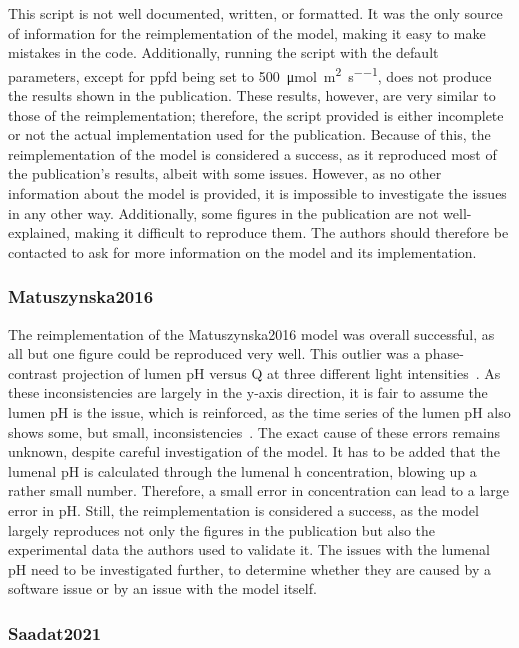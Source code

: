 This script is not well documented, written, or formatted. It was the only source of information for the reimplementation of the model, making it easy to make mistakes in the code. Additionally, running the script with the default parameters, except for \gls{ppfd} being set to \qty{500}{\micro\mol\per\meter\squared\per\second}, does not produce the results shown in the publication. These results, however, are very similar to those of the reimplementation; therefore, the script provided is either incomplete or not the actual implementation used for the publication. Because of this, the reimplementation of the model is considered a success, as it reproduced most of the publication's results, albeit with some issues. However, as no other information about the model is provided, it is impossible to investigate the issues in any other way. Additionally, some figures in the publication are not well-explained, making it difficult to reproduce them. The authors should therefore be contacted to ask for more information on the model and its implementation.

\subsubsection{Matuszynska2016}

The reimplementation of the Matuszynska2016 model was overall successful, as all but one figure could be reproduced very well. This outlier was a phase-contrast projection of lumen pH versus \gls{Q} at three different light intensities~. As these inconsistencies are largely in the y-axis direction, it is fair to assume the lumen pH is the issue, which is reinforced, as the time series of the lumen pH also shows some, but small, inconsistencies~. The exact cause of these errors remains unknown, despite careful investigation of the model. It has to be added that the lumenal pH is calculated through the lumenal \gls{h} concentration, blowing up a rather small number. Therefore, a small error in concentration can lead to a large error in pH. Still, the reimplementation is considered a success, as the model largely reproduces not only the figures in the publication but also the experimental data the authors used to validate it. The issues with the lumenal pH need to be investigated further, to determine whether they are caused by a software issue or by an issue with the model itself.

\subsubsection{Saadat2021}

